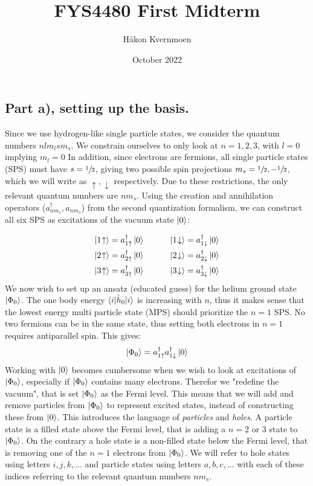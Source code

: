 \documentclass{article}
\title{FYS4480 First Midterm}
\author{Håkon Kvernmoen}
\date{October 2022}
\newcommand{\vac}{\ket{0}}
\newcommand{\gs}{\ket{\Phi_0}}
\newcommand{\ups}[1]{#1\uparrow}
\newcommand{\downs}[1]{#1\downarrow}
\newcommand{\upst}[1]{#1\hspace{-2px}\uparrow}
\newcommand{\downst}[1]{#1\hspace{-2px}\downarrow}
\newcommand{\inner}[3]{\braket{#1|#2|#3}}
\newcommand{\hnull}{\hat{h}_0}
\newcommand{\crt}[1]{a_{#1}^{\dagger}}
\newcommand{\ani}[1]{a_{#1}}
\begin{document}
\maketitle

\subsection*{Part a), setting up the basis.}
    Since we use hydrogen-like single particle states, we consider the quantum numbers $nlm_l sm_s$. We constrain ourselves to only look at $n = 1,2,3$, with $l = 0$ implying $m_l = 0$ In addition, since electrons are fermions, all single particle states (SPS) must have $s = \sfrac{1}{2}$, giving two possible spin projections $m_s = \sfrac{1}{2}, -\sfrac{1}{2}$, which we will write as $\uparrow, \downarrow$ respectively. Due to these restrictions, the only relevant quantum numbers are $nm_s$. Using the creation and annihilation operators ($\crt{nm_s}, \ani{nm_s}$) from the second quantization formalism, we can construct all six SPS as excitations of the vacuum state $\vac$:
    
    \begin{align*}
        \ket{\upst{1}}=\crt{\ups{1}}\vac\hspace{30px}&\ket{\downst{1}}=\crt{\downs{1}}\vac\\
        \ket{\upst{2}}=\crt{\ups{2}}\vac\hspace{30px}&\ket{\downst{2}}=\crt{\downs{2}}\vac\\
        \ket{\upst{3}}=\crt{\ups{3}}\vac\hspace{30px}&\ket{\downst{3}}=\crt{\downs{3}}\vac
    \end{align*}
    We now wish to set up an ansatz (educated guess) for the helium ground state $\gs$. The one body energy $\inner{i}{\hnull}{i}$ is increasing with $n$, thus it makes sense that the lowest energy multi particle state (MPS) should prioritize the $n = 1$ SPS. No two fermions can be in the same state, thus setting both electrons in $n = 1$ requires antiparallel spin. This gives:   
    \begin{align*}
        \gs = \crt{\ups{1}}\crt{\downs{1}}\vac
    \end{align*}
    Working with $\vac$ becomes cumbersome when we wish to look at excitations of $\gs$, especially if $\gs$ contains many electrons. Therefor we "redefine the vacuum", that is set $\gs$ as the Fermi level. This means that we will add and remove particles from $\gs$ to represent excited states, instead of constructing these from $\vac$. This introduces the language of \textit{particles} and \textit{holes}. A particle state is a filled state above the Fermi level, that is adding a $n = 2$ or $3$ state to $\gs$. On the contrary a hole state is a non-filled state below the Fermi level, that is removing one of the $n = 1$ electrons from $\gs$. We will refer to hole states using letters $i,j,k, ...$ and particle states using letters $a,b,c,...$ with each of these indices referring to the relevant quantum numbers $nm_s$. 
    
\end{document}
